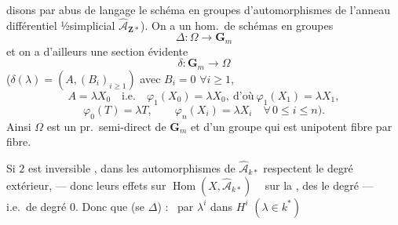 \documentclass[11pt,a4paper]{article}
\begin{document}
disons par abus de langage le schéma en groupes d'automorphismes de l'anneau différentiel ½simplicial $\widehat{\mathcal{A}}_{\mathbf{Z}*}$). On a un hom.\ de schémas en groupes
\[
\Delta\colon\Omega\to\mathbf{G}_{m}
\]
et on a d'ailleurs une section évidente
\[
\delta\colon\mathbf{G}_{m}\to\Omega
\]
($\delta(\lambda)=(A,(B_{i})_{i\geq 1})$ avec $B_{i}=0$ $\forall i\geq 1$,
\[
A=\lambda X_{0}\quad\text{i.e.}\quad \varphi_{1}(X_{0})=\lambda X_{0},\ \text{d'où}\ \varphi_{1}(X_{1})=\lambda X_{1},
\]
\[
\varphi_{0}(T)=\lambda T,\qquad \varphi_{n}(X_{i})=\lambda X_{i}\quad\forall\, 0\leq i\leq n).
\]
Ainsi $\Omega$ est  un pr.\ semi-direct de $\mathbf{G}_{m}$ et d'un groupe qui est \ill{} unipotent fibre par fibre.

Si $2$ est inversible , \struck{\ill{}}  \ill{}  dans les automorphismes de $\widehat{\mathcal{A}}_{k*}$ respectent le degré extérieur, — donc leurs effets sur $\operatorname{Hom}(X,\widehat{\mathcal{A}}_{k*})$ \ \ill{} sur la , des   \ill{} le degré — i.e.\ de degré $0$. Donc \ill{}  \ill{} que \ill{} (se  \ill{} $\Delta$) : \ par $\lambda^{i}$ dans $H^{i}$ $(\lambda\in k^{*})$
\end{document}
